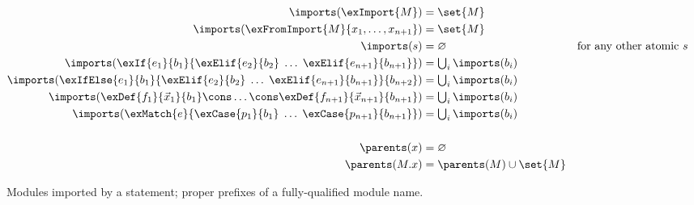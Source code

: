 \begin{figure}
\small
\begin{align*}
\imports(\exImport{M}) &= \set{M} \\
\imports(\exFromImport{M}{x_1, \ldots, x_{n+1}}) &= \set{M} \\
\imports(s) &= \varnothing & \text{for any other atomic $s$} \\
\imports(\exIf{e_1}{b_1}{\exElif{e_2}{b_2}\;\ldots\;\exElif{e_{n+1}}{b_{n+1}}}) &= \textstyle\bigcup_i \imports(b_i) \\
\imports(\exIfElse{e_1}{b_1}{\exElif{e_2}{b_2}\;\ldots\;\exElif{e_{n+1}}{b_{n+1}}}{b_{n+2}}) &= \textstyle\bigcup_i \imports(b_i) \\
\imports(\exDef{f_1}{\vec{x}_1}{b_1} \cons \ldots \cons \exDef{f_{n+1}}{\vec{x}_{n+1}}{b_{n+1}}) &= \textstyle\bigcup_i \imports(b_i) \\
\imports(\exMatch{e}{\exCase{p_1}{b_1}\;\ldots\;\exCase{p_{n+1}}{b_{n+1}}}) &= \textstyle\bigcup_i \imports(b_i) \\
\\
\parents(x) &= \varnothing \\
\parents(M.x) &= \parents(M) \cup \set{M}
\end{align*}
\caption{Modules imported by a statement; proper prefixes of a fully-qualified module name.}
\label{fig:imports}
\end{figure}
